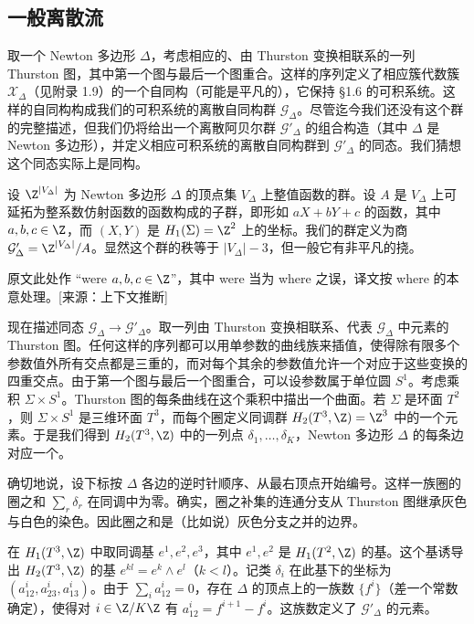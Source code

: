 \subsection{一般离散流}

取一个 Newton 多边形 $\Delta$，考虑相应的、由 Thurston 变换相联系的一列 Thurston 图，其中第一个图与最后一个图重合。这样的序列定义了相应簇代数簇 $\mathcal{X}_\Delta$（见附录 1.9）的一个自同构（可能是平凡的），它保持 §1.6 的可积系统。这样的自同构构成我们的可积系统的离散自同构群 $\mathcal{G}_\Delta$。尽管迄今我们还没有这个群的完整描述，但我们仍将给出一个离散阿贝尔群 $\mathcal{G}'_\Delta$ 的组合构造（其中 $\Delta$ 是 Newton 多边形），并定义相应可积系统的离散自同构群到 $\mathcal{G}'_\Delta$ 的同态。我们猜想这个同态实际上是同构。

设 $\Z^{|V_\Delta|}$ 为 Newton 多边形 $\Delta$ 的顶点集 $V_\Delta$ 上整值函数的群。设 $A$ 是 $V_\Delta$ 上可延拓为整系数仿射函数的函数构成的子群，即形如 $aX+bY+c$ 的函数，其中 $a,b,c\in\Z$，而 $(X,Y)$ 是 $H_1(\Sigma)=\Z^2$ 上的坐标。我们的群定义为商 $\mathcal{G}'_\Delta=\Z^{|V_\Delta|}/A$。显然这个群的秩等于 $|V_\Delta|-3$，但一般它有非平凡的挠。\begin{annote}原文此处作 “were $a,b,c\in\Z$”，其中 were 当为 where 之误，译文按 where 的本意处理。[来源：上下文推断]\end{annote}

现在描述同态 $\mathcal{G}_\Delta\to\mathcal{G}'_\Delta$。取一列由 Thurston 变换相联系、代表 $\mathcal{G}_\Delta$ 中元素的 Thurston 图。任何这样的序列都可以用单参数的曲线族来插值，使得除有限多个参数值外所有交点都是三重的，而对每个其余的参数值允许一个对应于这些变换的四重交点。由于第一个图与最后一个图重合，可以设参数属于单位圆 $S^1$。考虑乘积 $\Sigma\times S^1$。Thurston 图的每条曲线在这个乘积中描出一个曲面。若 $\Sigma$ 是环面 $T^2$，则 $\Sigma\times S^1$ 是三维环面 $T^3$，而每个圈定义同调群 $H_2(T^3,\Z)=\Z^3$ 中的一个元素。于是我们得到 $H_2(T^3,\Z)$ 中的一列点 $\delta_1,\dots,\delta_K$，Newton 多边形 $\Delta$ 的每条边对应一个。

确切地说，设下标按 $\Delta$ 各边的逆时针顺序、从最右顶点开始编号。这样一族圈的圈之和 $\sum_r\delta_r$ 在同调中为零。确实，圈之补集的连通分支从 Thurston 图继承灰色与白色的染色。因此圈之和是（比如说）灰色分支之并的边界。

在 $H_1(T^3,\Z)$ 中取同调基 $e^1,e^2,e^3$，其中 $e^1,e^2$ 是 $H_1(T^2,\Z)$ 的基。这个基诱导出 $H_2(T^3,\Z)$ 的基 $e^{kl}=e^k\wedge e^l$（$k<l$）。记类 $\delta_i$ 在此基下的坐标为 $(a^i_{12},a^i_{23},a^i_{13})$。由于 $\sum_i a^i_{12}=0$，存在 $\Delta$ 的顶点上的一族数 $\{f^i\}$（差一个常数确定），使得对 $i\in\Z/K\Z$ 有 $a^i_{12}=f^{i+1}-f^i$。这族数定义了 $\mathcal{G}'_\Delta$ 的元素。


